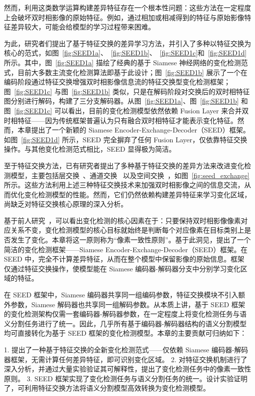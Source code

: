 然而，利用这类数学运算构建差异特征存在一个根本性问题：这些方法在一定程度上会破坏双时相影像的原始特征。例如，通过相加或相减得到的特征与原始影像特征差异较大，可能会给模型的学习过程带来困难。

为此，研究者们提出了基于特征交换的差异学习方法，并引入了多种以特征交换为核心的范式，如图~\ref{fig:SEED1a}、~\ref{fig:SEED1b}、~\ref{fig:SEED1c}和~\ref{fig:SEED1d}所示。其中，图~\ref{fig:SEED1a} 描绘了经典的基于 Siamese 神经网络的变化检测范式，目前大多数主流变化检测算法即基于此设计；图~\ref{fig:SEED1b} 展示了一个在编码阶段通过特征交换增强双时相影像信息流的特征交换型变化检测框架；图~\ref{fig:SEED1c} 与图~\ref{fig:SEED1b} 类似，只是在解码阶段对交换后的双时相特征图分别进行解码，构建了三分支解码器。从图~\ref{fig:SEED1a}、图~\ref{fig:SEED1b} 和图~\ref{fig:SEED1c} 可以看出，目前的变化检测模型依然依赖 Fusion Layer 来合并双时相特征——因为传统框架普遍认为只有融合双时相特征才能表示变化特征。然而，本章提出了一个新颖的 Siamese Encoder-Exchange-Decoder（SEED）框架。如图~\ref{fig:SEED1d} 所示，SEED 完全摒弃了任何 Fusion Layer，仅依靠特征交换操作。与其他变化检测范式相比，SEED 显得极为简洁。

至于特征交换方法，已有研究者提出了多种基于特征交换的差异方法来改进变化检测模型，主要包括层交换~\cite{dong_efficientcd_2024}、通道交换~\cite{Fang2022ChangerFI,zhao_exchanging_2023} 以及空间交换~\cite{Fang2022ChangerFI,zhao_exchanging_2023}，如图~\ref{fig:seed_exchange} 所示。这些方法利用上述三种特征交换技术来加强双时相影像之间的信息交流，从而优化变化检测模型的性能。然而，它们仍然依赖构建差异特征来学习变化区域，尚缺乏对特征交换核心原理的深入分析。

基于前人研究~\cite{dong_efficientcd_2024,Fang2022ChangerFI,zhao_exchanging_2023}，可以看出变化检测的核心因素在于：只要保持双时相影像像素对应关系不变，变化检测模型的核心目标就始终是判断每个对应像素在目标类别上是否发生了变化。本章将这一原则称为“像素一致性原则”。基于此洞见，提出了一个简洁的变化检测框架——Siamese Encoder-Exchange-Decoder（SEED）框架。在 SEED 中，完全不计算差异特征，从而在整个模型中保留影像的原始信息。框架仅通过特征交换操作，使模型能在 Siamese 编码器-解码器分支中分别学习变化区域的特征。

在 SEED 框架中，Siamese 编码器共享同一组编码参数，特征交换模块不引入额外参数，Siamese 解码器也共享同一组解码参数。从本质上讲，基于 SEED 框架的变化检测架构仅需一套编码器-解码器参数，在一定程度上将变化检测任务与语义分割任务进行了统一。因此，几乎所有基于编码器-解码器结构的语义分割模型均可直接转化为基于 SEED 框架的变化检测模型。本章的主要贡献可归纳如下：

1. 提出了一种基于特征交换的全新变化检测范式——仅依赖 Siamese 编码器-解码器框架，无需计算任何差异特征，即可识别变化区域。
2. 对特征交换机制进行了深入分析，并通过大量实验验证其可解释性，提出了变化检测任务中的像素一致性原则。
3. SEED 框架实现了变化检测任务与语义分割任务的统一。设计实验证明了，可利用特征交换方法将语义分割模型高效转换为变化检测模型。


